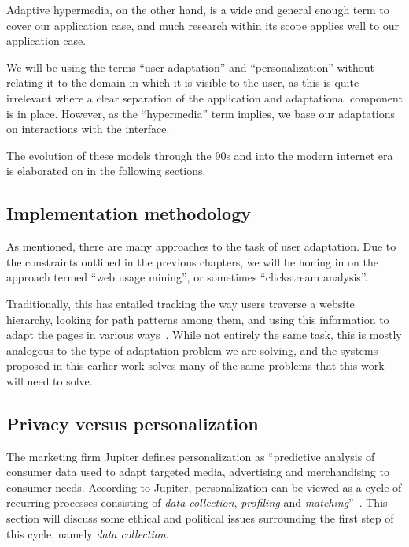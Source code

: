 Adaptive hypermedia, on the other hand, is a wide and general enough term to cover our application case, and much research within its scope applies well to our application case.

We will be using the terms ``user adaptation'' and ``personalization'' without relating it to the domain in which it is visible to the user, as this is quite irrelevant where a clear separation of the application and adaptational component is in place. However, as the ``hypermedia'' term implies, we base our adaptations on interactions with the interface.

The evolution of these models through the 90s and into the modern internet era is elaborated on in the following sections.

\subsection{Implementation methodology}

As mentioned, there are many approaches to the task of user adaptation. Due to the constraints outlined in the previous chapters, we will be honing in on the approach termed ``web usage mining'', or sometimes ``clickstream analysis''.

Traditionally, this has entailed tracking the way users traverse a website hierarchy, looking for path patterns among them, and using this information to adapt the pages in various ways~\cite{Mobasher2000,Eirinaki2003,Montgomery2009}. While not entirely the same task, this is mostly analogous to the type of adaptation problem we are solving, and the systems proposed in this earlier work solves many of the same problems that this work will need to solve.

%
%

\subsection{Privacy versus personalization}
\label{survey:sec:privacy_vs_personalization}

The marketing firm Jupiter defines personalization as ``predictive analysis of consumer data used to adapt targeted media, advertising and merchandising to consumer needs. According to Jupiter, personalization can be viewed as a cycle of recurring processes consisting of \emph{data collection}, \emph{profiling} and \emph{matching}''~\cite{Foster2000}. This section will discuss some ethical and political issues surrounding the first step of this cycle, namely \emph{data collection}.

